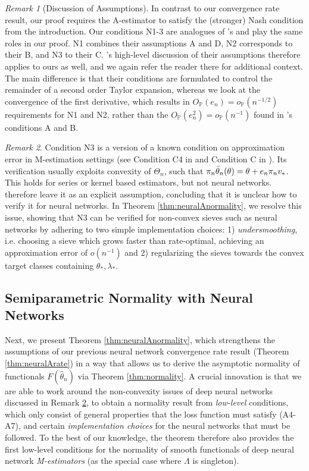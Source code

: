 \documentclass[12pt]{article}
\theoremstyle{myplain}
\theoremstyle{definition}
\theoremstyle{definition}
\theoremstyle{remark}
\newtheorem{remark}{Remark}[section]
\numberwithin{equation}{section}
\begin{document}
\begin{remark}[Discussion of Assumptions]
In contrast to our convergence rate result, our proof requires the A-estimator to satisfy the (stronger) Nash condition from the introduction. Our conditions N1-3 are analogues of \cite{shen1997onmethods}'s and play the same roles in our proof. N1 combines their assumptions A and D, N2 corresponds to their B, and N3 to their C. \cite{shen1997onmethods}'s high-level discussion of their assumptions therefore applies to ours as well, and we again refer the reader there for additional context. The main difference is that their conditions are formulated to control the remainder of a second order Taylor expansion, whereas we look at the convergence of the first derivative, which results in $O_\mathbb{P}(e_n)=o_\mathbb{P}(n^{-1/2})$ requirements for N1 and N2, rather than the $O_\mathbb{P}(e_n^2)=o_\mathbb{P}(n^{-1})$ found in \cite{shen1997onmethods}'s conditions A and B. 
\end{remark}
\begin{remark}\label{rem:nonconvex}
Condition N3 is a version of a known condition on approximation error in M-estimation settings (see Condition C4 in \cite{shen2019asymptotic} and Condition C in \cite{shen1994}). Its verification usually exploits convexity of $\Theta_n$, such that $\pi_n\Bar{\theta}_n(\theta)=\theta+e_n\pi_n v_*$. This holds for series or kernel based estimators, but not neural networks. \cite{shen2019asymptotic} therefore leave it as an explicit assumption, concluding that it is unclear how to verify it for neural networks. In Theorem \ref{thm:neuralAnormality}, we resolve this issue, showing that N3 can be verified for non-convex sieves such as neural networks by adhering to two simple implementation choices: 1) \textit{undersmoothing}, i.e. choosing a sieve which grows faster than rate-optimal, achieving an approximation error of $o(n^{-1})$ and 2) regularizing the sieves towards the convex target classes containing $\theta_*,\lambda_*$.
\end{remark}


\subsection{Semiparametric Normality with Neural Networks}
\label{subsec:neuralAnormality}
Next, we present Theorem \ref{thm:neuralAnormality}, which strengthens the assumptions of our previous neural network convergence rate result (Theorem \ref{thm:neuralArate}) in a way that allows us to derive the asymptotic normality of functionals $F(\widehat\theta_n)$ via Theorem \ref{thm:normality}. A crucial innovation is that we are able to work around the non-convexity issues of deep neural networks discussed in Remark \ref{rem:nonconvex}, to obtain a normality result from {\it low-level} conditions, which only consist of general properties that the loss function must satisfy (A4-A7), and certain {\it implementation choices} for the neural networks that must be followed. To the best of our knowledge, the theorem therefore also provides the first low-level conditions for the normality of smooth functionals of deep neural network {\it M-estimators} (as the special case where $\Lambda$ is singleton). 
\end{document}
